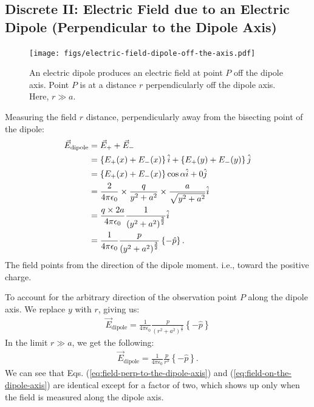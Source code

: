 \documentclass[12pt,b4paper]{article}
\begin{document}
\subsection{Discrete II: Electric Field due to an Electric Dipole (Perpendicular to the Dipole Axis)}
\begin{figure}[H]
    \centering
    \texttt{[image: figs/electric-field-dipole-off-the-axis.pdf]}
    \caption{An electric dipole produces an electric field at point $P$ off the dipole axis. Point $P$ is at a distance $r$ perpendicularly off the dipole axis. Here, $r\gg a$.}
    \label{fig:electric-field-dipole}
\end{figure}
Measuring the field $r$ distance, perpendicularly away from the bisecting point of the dipole:
\begin{align}
    \vec{E}_\text{dipole}&=\vec{E}_++\vec{E}_-\notag\\
    &=\left\{E_+(x)+E_-(x)\right\}\hat{i}+\left\{E_+(y)+E_-(y)\right\}\hat{j}\notag\\
    &=\left\{E_+(x)+E_-(x)\right\}\cos\alpha\hat{i}+0\hat{j}\notag\\
    &=\frac{2}{4\pi\epsilon_0}\times\frac{q}{y^2+a^2}\times\frac{a}{\sqrt{y^2+a^2}}\hat{i}\notag\\
    &=\frac{q\times 2a}{4\pi\epsilon_0}\frac{1}{\left(y^2+a^2\right)^{\frac{3}{2}}}\hat{i}\notag\\
    &=\frac{1}{4\pi\epsilon_0}\frac{{p}}{\left(y^2+a^2\right)^{\frac{3}{2}}}\left\{-\hat{p}\right\}.
\end{align}
The field points from the direction of the dipole moment. i.e., toward the positive charge.

To account for the arbitrary direction of the observation point $P$ along the dipole axis. We replace $y$ with $r$, giving us:
\begin{align}
    \vec{E}_\text{dipole}=\frac{1}{4\pi\epsilon_0}\frac{{p}}{\left(r^2+a^2\right)^{\frac{3}{2}}}\left\{-\hat{p}\right\}
\end{align}
In the limit $r\gg a$, we get the following:
\begin{align}
    \vec{E}_\text{dipole}=\frac{1}{4\pi\epsilon_0}\frac{{p}}{r^3}\left\{-\hat{p}\right\}.\label{eq:field-perp-to-the-dipole-axis}
\end{align}
We can see that Eqs. (\ref{eq:field-perp-to-the-dipole-axis}) and (\ref{eq:field-on-the-dipole-axis}) are identical except for a factor of two, which shows up only when the field is measured along the dipole axis.
\end{document}
